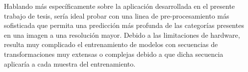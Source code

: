 Hablando más específicamente sobre la aplicación desarrollada en el presente trabajo de tesis, sería ideal probar con una linea de pre-procesamiento más sofisticada que permita una predicción más profunda de las categorías presentes en una imagen a una resolución mayor. Debido a las limitaciones de hardware, resulta muy complicado el entrenamiento de modelos con secuencias de transformaciones muy extensas o complejas debido a que dicha secuencia aplicaría a cada muestra del entrenamiento. 



\nocite{*}